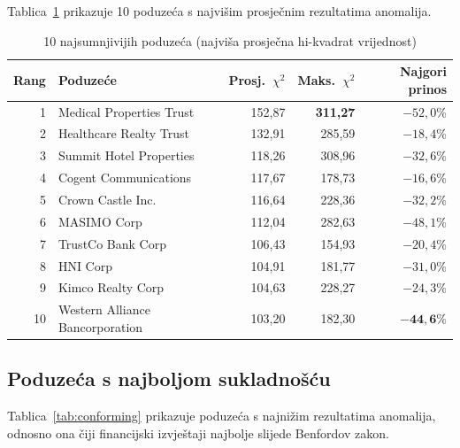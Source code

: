 \documentclass[12pt,a4paper]{article}
\begin{document}
Tablica~\ref{tab:suspicious} prikazuje 10 poduzeća s najvišim prosječnim rezultatima anomalija.

\begin{table}[H]
\centering
\caption{10 najsumnjivijih poduzeća (najviša prosječna hi-kvadrat vrijednost)}
\label{tab:suspicious}
\begin{tabular}{rlrrr}
\toprule
\textbf{Rang} & \textbf{Poduzeće} & \textbf{Prosj.\ $\chi^2$} & \textbf{Maks.\ $\chi^2$} & \textbf{Najgori prinos} \\
\midrule
1 & Medical Properties Trust & 152,87 & \textbf{311,27} & $-52{,}0$\% \\
2 & Healthcare Realty Trust & 132,91 & 285,59 & $-18{,}4$\% \\
3 & Summit Hotel Properties & 118,26 & 308,96 & $-32{,}6$\% \\
4 & Cogent Communications & 117,67 & 178,73 & $-16{,}6$\% \\
5 & Crown Castle Inc. & 116,64 & 228,36 & $-32{,}2$\% \\
6 & MASIMO Corp & 112,04 & 282,63 & $-48{,}1$\% \\
7 & TrustCo Bank Corp & 106,43 & 154,93 & $-20{,}4$\% \\
8 & HNI Corp & 104,91 & 181,77 & $-31{,}0$\% \\
9 & Kimco Realty Corp & 104,63 & 228,27 & $-24{,}3$\% \\
10 & Western Alliance Bancorporation & 103,20 & 182,30 & $\mathbf{-44{,}6}$\% \\
\bottomrule
\end{tabular}
\end{table}

\subsection{Poduzeća s najboljom sukladnošću}

Tablica~\ref{tab:conforming} prikazuje poduzeća s najnižim rezultatima anomalija, odnosno ona čiji financijski izvještaji najbolje slijede Benfordov zakon.
\end{document}
